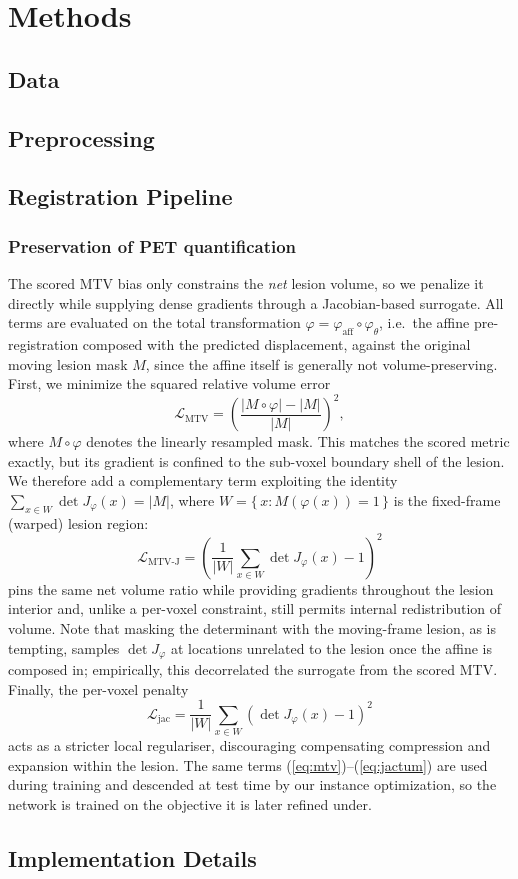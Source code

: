 \section{Methods}
\subsection{Data}
\subsection{Preprocessing}
\subsection{Registration Pipeline}
\subsubsection{Preservation of PET quantification}
The scored MTV bias only constrains the \emph{net} lesion volume, so we
penalize it directly while supplying dense gradients through a Jacobian-based
surrogate. All terms are evaluated on the total transformation
$\varphi = \varphi_{\mathrm{aff}} \circ \varphi_{\theta}$, i.e.\ the affine
pre-registration composed with the predicted displacement, against the
original moving lesion mask $M$, since the affine itself is generally not
volume-preserving. First, we minimize the squared relative volume error
%
\begin{equation}
  \mathcal{L}_{\mathrm{MTV}}
  = \left( \frac{\lvert M \circ \varphi \rvert - \lvert M \rvert}
                {\lvert M \rvert} \right)^{2},
  \label{eq:mtv}
\end{equation}
%
where $M \circ \varphi$ denotes the linearly resampled mask. This matches the
scored metric exactly, but its gradient is confined to the sub-voxel boundary
shell of the lesion. We therefore add a complementary term exploiting the
identity $\sum_{x \in W} \det J_{\varphi}(x) = \lvert M \rvert$, where
$W = \{\, x : M(\varphi(x)) = 1 \,\}$ is the fixed-frame (warped) lesion
region:
%
\begin{equation}
  \mathcal{L}_{\mathrm{MTV\text{-}J}}
  = \left( \frac{1}{\lvert W \rvert} \sum_{x \in W}
    \det J_{\varphi}(x) - 1 \right)^{2}
  \label{eq:mtvjac}
\end{equation}
%
pins the same net volume ratio while providing gradients throughout the
lesion interior and, unlike a per-voxel constraint, still permits internal
redistribution of volume. Note that masking the determinant with the
moving-frame lesion, as is tempting, samples $\det J_{\varphi}$ at locations
unrelated to the lesion once the affine is composed in; empirically, this
decorrelated the surrogate from the scored MTV. Finally, the per-voxel
penalty
%
\begin{equation}
  \mathcal{L}_{\mathrm{jac}}
  = \frac{1}{\lvert W \rvert} \sum_{x \in W}
    \left( \det J_{\varphi}(x) - 1 \right)^{2}
  \label{eq:jactum}
\end{equation}
%
acts as a stricter local regulariser, discouraging compensating compression
and expansion within the lesion. The same terms
(\ref{eq:mtv})--(\ref{eq:jactum}) are used during training and descended at
test time by our instance optimization, so the network is trained on the
objective it is later refined under.
\subsection{Implementation Details}
